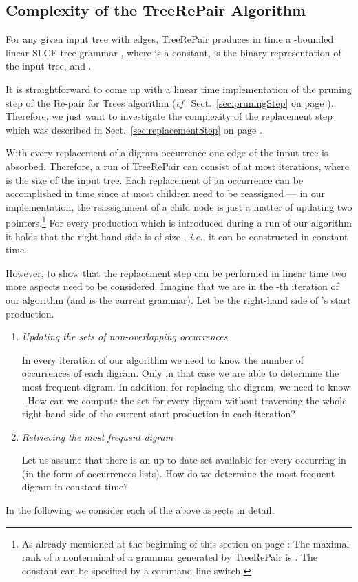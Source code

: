 \documentclass[12pt]{llncs}
\newcommand{\tp}{digram\xspace}
\newcommand{\trp}{\mbox{TreeRePair}\xspace}
\newcommand{\hairsp}{\hspace{1pt}}\newcommand{\TODO}{\textcolor{red}{\bf TODO!}\xspace}
\newcommand{\ie}{\mbox{\textit{i.\hairsp{}e.}}\xspace}
\newcommand{\cf}{\textit{cf.}~}
\begin{document}
\subsection{Complexity of the \trp Algorithm}\label{sec:complexityReplacementStep}

\begin{theorem}
For any given input tree with  edges, \trp produces in time
 a -bounded linear SLCF tree grammar
, where  is a constant,  
is the binary representation of the input tree, and
. 
\end{theorem}
It is straightforward to come up with a linear time implementation of the pruning step of the Re-pair for Trees algorithm (\cf Sect.~\ref{sec:pruningStep} on page \pageref{sec:pruningStep}). Therefore, we just want to investigate the complexity of the replacement step which was described in Sect.~\ref{sec:replacementStep} on page \pageref{sec:replacementStep}.

With every replacement of a \tp occurrence one edge of the input tree is absorbed. Therefore, a run of \trp can consist of at most  iterations, where  is the size of the input tree. Each replacement of an occurrence can be accomplished in  time since at most  children need to be reassigned --- in our implementation, the reassignment of a child node is just a matter of updating two pointers.\footnote{As already mentioned at the beginning of this section on page \pageref{ch:implementationDetails}: The maximal rank of a nonterminal of a grammar generated by \trp is . The constant  can be specified by a command line switch.} For every production which is introduced during a run of our algorithm it holds that the right-hand side  is of size , \ie, it can be constructed in constant time. 

However, to show that the replacement step can be performed in linear time two more aspects need to be considered. Imagine that we are in the -th iteration of our algorithm (and  is the current grammar). Let  be the right-hand side of 's start production.
\begin{enumerate}[(1)]
	\item \emph{Updating the sets of non-overlapping occurrences}
	
		In every iteration of our algorithm we need to know the number of occurrences of each \tp. Only in that case we are able to determine the most frequent \tp. In addition, for replacing the \tp , we need to know . How can we compute the set  for every \tp  without traversing the whole right-hand side of the current start production in each iteration?
	\item \emph{Retrieving the most frequent \tp} 
	
		Let us assume that there is an up to date set  available for every  occurring in  (in the form of occurrences lists). How do we determine the most frequent \tp in constant time?
\end{enumerate}
In the following we consider each of the above aspects in detail.
\end{document}
